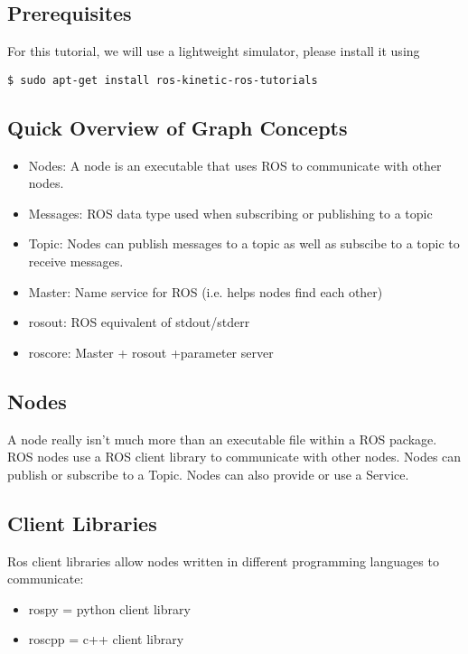 \subsection{Prerequisites}
For this tutorial, we will use a lightweight simulator, please install it using
\begin{lstlisting}[breaklines=true languages=bash]
$ sudo apt-get install ros-kinetic-ros-tutorials
\end{lstlisting}

\subsection{Quick Overview of Graph Concepts}

\begin{itemize}
	\item Nodes: A node is an executable that uses ROS to communicate with other nodes.
	\item Messages: ROS data type used when subscribing or publishing to a topic
	\item Topic: Nodes can publish messages to a topic as well as subscibe to a topic to receive messages.
	\item Master: Name service for ROS (i.e. helps nodes find each other)
	\item rosout: ROS equivalent of stdout/stderr
	\item roscore: Master + rosout +parameter server
\end{itemize}

\subsection{Nodes}
A node really isn't much more than an executable file within a ROS package. ROS nodes use a ROS client library to communicate with other nodes. Nodes can publish or subscribe to a Topic. Nodes can also provide or use a Service.

\subsection{Client Libraries}
Ros client libraries allow nodes written in different programming languages to communicate:
\begin{itemize}
	\item rospy = python client library
	\item roscpp = c++ client library
\end{itemize}

